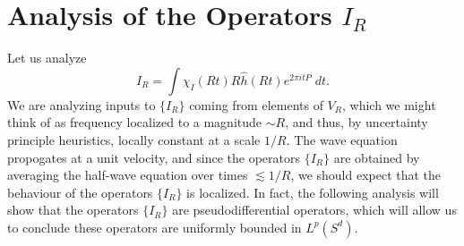 \section{Analysis of the Operators $I_R$}

Let us analyze
%
\[ I_R = \int \chi_I(Rt) R \widehat{h}(Rt) e^{2 \pi i t P}\; dt. \]
%
We are analyzing inputs to $\{ I_R \}$ coming from elements of $V_R$, which we might think of as frequency localized to a magnitude $\sim R$, and thus, by uncertainty principle heuristics, locally constant at a scale $1/R$. The wave equation propogates at a unit velocity, and since the operators $\{ I_R \}$ are obtained by averaging the half-wave equation over times $\lesssim 1/R$, we should expect that the behaviour of the operators $\{ I_R \}$ is localized. In fact, the following analysis will show that the operators $\{ I_R \}$ are pseudodifferential operators, which will allow us to conclude these operators are uniformly bounded in $L^p(S^d)$.

